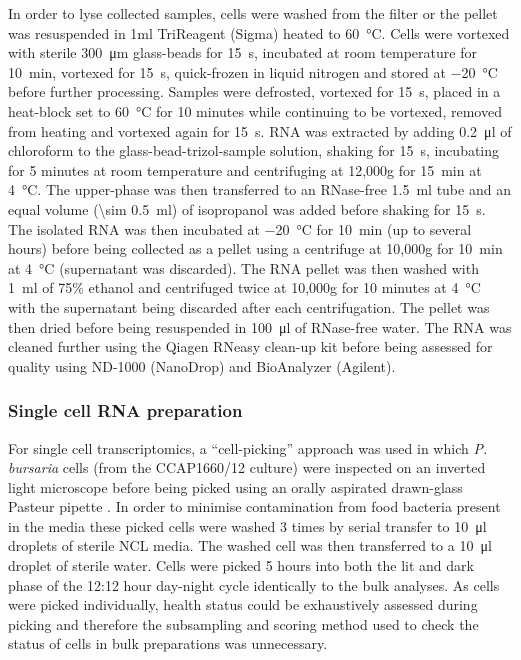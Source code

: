 In order to lyse collected samples, cells were washed from the filter or the 
pellet was resuspended in 1ml TriReagent (Sigma) heated to \SI{60}{\degreeCelsius}. 
Cells were vortexed with sterile \SI{300}{\micro\metre} glass-beads for \SI{15}{\second}, incubated at 
room temperature for \SI{10}{\minute}, vortexed for \SI{15}{\second}, quick-frozen in liquid 
nitrogen and stored at \SI{-20}{\degreeCelsius}
before further processing.  
Samples were defrosted, vortexed for \SI{15}{\second}, placed in a heat-block set 
to \SI{60}{\degreeCelsius}
for 10 minutes while continuing to be vortexed, removed from 
heating and vortexed again for \SI{15}{\second}.
RNA was extracted by adding \SI{0.2}{\micro\litre} of chloroform to the glass-bead-trizol-sample 
solution, shaking for \SI{15}{\second}, incubating for 5 minutes at room temperature and 
centrifuging at 12,000g for \SI{15}{\minute} at \SI{4}{\degreeCelsius}.  
The upper-phase was then transferred to an RNase-free \SI{1.5}{\milli\litre} tube and an 
equal volume (\SI{\sim 0.5}{\milli\litre}) of isopropanol was added before shaking for \SI{15}{\second}.  
The isolated RNA was then incubated at \SI{-20}{\degreeCelsius} for \SI{10}{\minute}
(up to several hours) before being collected as a pellet using a centrifuge at 
10,000g for \SI{10}{\minute} at \SI{4}{\degreeCelsius}
(supernatant was discarded). 
The RNA pellet was then washed with \SI{1}{\milli\litre} of 75\% ethanol and centrifuged 
twice at 10,000g for 10 minutes at \SI{4}{\degreeCelsius} with the supernatant being 
discarded after each centrifugation.  
The pellet was then dried before being resuspended in \SI{100}{\micro\litre} of RNase-free water.  
The RNA was cleaned further using the Qiagen RNeasy clean-up kit 
before being assessed for quality using ND-1000 (NanoDrop) and BioAnalyzer (Agilent).

\subsubsection{Single cell RNA preparation}
For single cell transcriptomics, a ``cell-picking'' approach was used in which
\textit{P. bursaria} cells (from the CCAP1660/12 culture) were inspected on an inverted light microscope 
before being picked using an orally aspirated drawn-glass Pasteur pipette \citep{Garcia-Cuetos2012}.
In order to minimise contamination from food bacteria present in the media these picked cells
were washed 3 times by serial transfer to \SI{10}{\micro\litre} droplets of sterile NCL media.
The washed cell was then transferred to a \SI{10}{\micro\litre} droplet of sterile water.
Cells were picked 5 hours into both the lit and dark phase of the 12:12 hour day-night cycle 
identically to the bulk analyses.
As cells were picked individually, health status could be exhaustively assessed
during picking and therefore the subsampling and scoring method used to
check the status of cells in bulk preparations was unnecessary.

